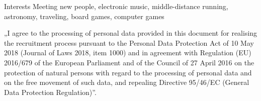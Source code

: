 \documentclass{resume} %
\begin{document}

\begin{rSection}{Interests}
Meeting new people, electronic music, middle-distance running, astronomy, traveling, board games, computer games
\end{rSection}


\vfill
\footnotesize „I agree to the processing of personal data provided in this document for realising the recruitment process
pursuant to the Personal Data Protection Act of 10 May 2018 (Journal of Laws 2018, item 1000) and in
agreement with Regulation (EU) 2016/679 of the European Parliament and of the Council of 27 April 2016 on
the protection of natural persons with regard to the processing of personal data and on the free movement of
such data, and repealing Directive 95/46/EC (General Data Protection Regulation)”.
\end{document}
